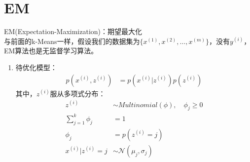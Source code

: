 \section{EM}
EM(Expectation-Maximization)：期望最大化 \\

与前面的k-Means一样，假设我们的数据集为$\{x^{(1)}, x^{(2)}, \dots, x^{(m)}\}$，没有$y^{(i)}$，EM算法也是无监督学习算法。 \\

\begin{enumerate}
	\item 待优化模型：
	\begin{align}
		p(x^{(i)}, z^{(i)}) &= p(x^{(i)}|z^{(i)})p(z^{(i)})
	\end{align}
	其中，$z^{(i)}$服从多项式分布：
	\begin{align}
		z^{(i)} &\sim Multinomial(\phi), \quad \phi_j \geq 0 \\
		 \sum_{j=1}^{k}\phi_j &=1 \\ 
		 \phi_j &= p(z^{(i)}=j) \\
		 x^{(i)}|z^{(i)}=j &\sim \mathcal{N}(\mu_j, \sigma_j)
	\end{align}
\end{enumerate}
















